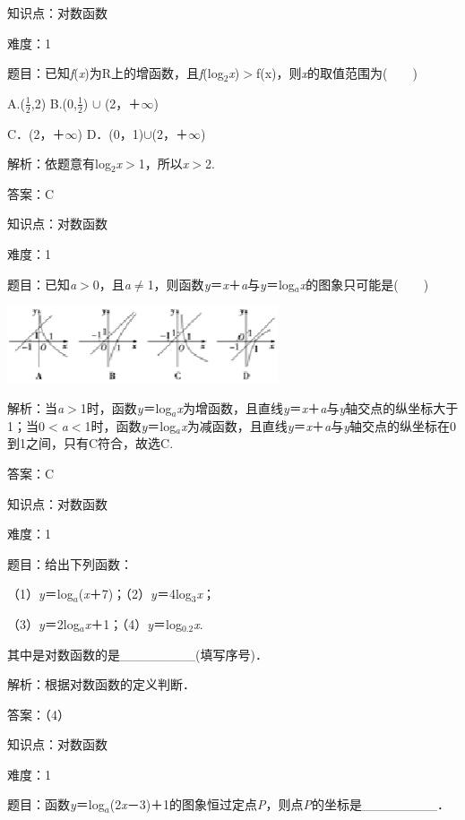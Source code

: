 \documentclass{article} %
\begin{document}
知识点：对数函数

难度：1

题目：已知\textit{f}(\textit{x})为R上的增函数，且\textit{f}(log${}_{2}$\textit{x})$\mathrm{>}$f(x)，则\textit{x}的取值范围为(　　)

A.($\frac{1}{2}$,2)   B.(0,$\frac{1}{2}$) $\mathrm{\cup}$ (2，＋$\mathrm{\infty}$)

C．(2，＋$\mathrm{\infty}$)   D．(0，1)$\mathrm{\cup}$(2，＋$\mathrm{\infty}$)

解析：依题意有log${}_{2}$\textit{x}$\mathrm{>}$1，所以\textit{x}$\mathrm{>}$2.

答案：C

知识点：对数函数

难度：1

题目：已知\textit{a}$\mathrm{>}$0，且\textit{a}$\mathrm{\neq}$1，则函数\textit{y}＝\textit{x}＋\textit{a}与\textit{y}＝log\textit{${}_{a}$x}的图象只可能是(　　)

\includegraphics*[width=3.15in, height=0.90in, keepaspectratio=false]{image60}

解析：当\textit{a}$\mathrm{>}$1时，函数\textit{y}＝log\textit{${}_{a}$x}为增函数，且直线\textit{y}＝\textit{x}＋\textit{a}与\textit{y}轴交点的纵坐标大于1；当0$\mathrm{<}$\textit{a}$\mathrm{<}$1时，函数\textit{y}＝log\textit{${}_{a}$x}为减函数，且直线\textit{y}＝\textit{x}＋\textit{a}与\textit{y}轴交点的纵坐标在0到1之间，只有C符合，故选C.

答案：C

知识点：对数函数

难度：1

题目：给出下列函数：

（1）\textit{y}＝log\textit{${}_{a}$}(\textit{x}＋7)；（2）\textit{y}＝4log${}_{3}$\textit{x}；

（3）\textit{y}＝2log\textit{${}_{a}$x}＋1；（4）\textit{y}＝log${}_{0.2}$\textit{x}.

其中是对数函数的是\_\_\_\_\_\_\_\_(填写序号)．

解析：根据对数函数的定义判断．

答案：（4）

知识点：对数函数

难度：1

题目：函数\textit{y}＝log\textit{${}_{a}$}(2\textit{x}－3)＋1的图象恒过定点\textit{P}，则点\textit{P}的坐标是\_\_\_\_\_\_\_\_．
\end{document}
